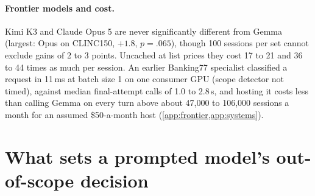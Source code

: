\documentclass[11pt]{article}
\begin{document}
\paragraph{Frontier models and cost.} Kimi K3 and Claude Opus 5 are never significantly different from Gemma (largest: Opus on CLINC150, $+1.8$, $p=.065$), though 100 sessions per set cannot exclude gains of 2 to 3 points. Uncached at list prices they cost 17 to 21 and 36 to 44 times as much per session. An earlier Banking77 specialist classified a request in 11\,ms at batch size 1 on one consumer GPU (scope detector not timed), against median final-attempt calls of 1.0 to 2.8\,s, and hosting it costs less than calling Gemma on every turn above about 47,000 to 106,000 sessions a month for an assumed \$50-a-month host (\cref{app:frontier,app:systems}).

\section{What sets a prompted model's out-of-scope decision}
\label{sec:operating}
\end{document}
